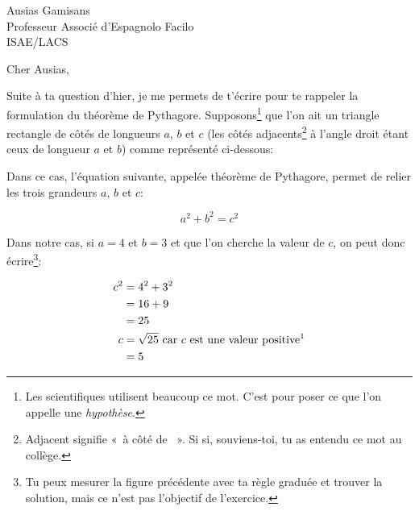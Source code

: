 \documentclass[pdftex,a4paper,12pt,origdate]{supaero-lettre}
\begin{document}
\begin{letter}{Ausias Gamisans\\ Professeur Associé d'Espagnolo
    Facilo\\ISAE/LACS}

\signature{Christophe Garion\\Resp. «~Mise à niveau littéraires~»}



\opening{Cher Ausias,}

Suite à ta question d'hier, je me permets de t'écrire pour te rappeler
la formulation du théorème de Pythagore. Supposons\footnote{Les
  scientifiques utilisent beaucoup ce mot. C'est pour poser ce que
  l'on appelle une \emph{hypothèse}.} que l'on ait un triangle
rectangle de côtés de longueurs $a$, $b$ et $c$ (les côtés
adjacents\footnote{Adjacent signifie «~à côté de ~». Si si,
  souviens-toi, tu as entendu ce mot au collège.} à l'angle droit
étant ceux de longueur $a$ et $b$) comme représenté ci-dessous:


  Dans ce cas, l'équation suivante, appelée théorème de Pythagore,
  permet de relier les trois grandeurs $a$, $b$ et $c$:

    \begin{equation}
      \label{eq:1}
      a^2 + b^2 = c^2
    \end{equation}

Dans notre cas, si $a = 4$ et $b = 3$ et que l'on cherche la valeur de
$c$, on peut donc écrire\footnote{Tu peux mesurer la figure précédente
  avec ta règle graduée et trouver la solution, mais ce n'est pas
  l'objectif de l'exercice.}:

\begin{equation*}
  \begin{split}
    c^2 & = 4^2 + 3^2\\
     & = 16 + 9\\
     & = 25\\
    c & = \sqrt{25} \text{ car $c$ est une valeur
      positive\footnotemark}\\
      & = 5
  \end{split}
\end{equation*}


\end{letter}
\end{document}
